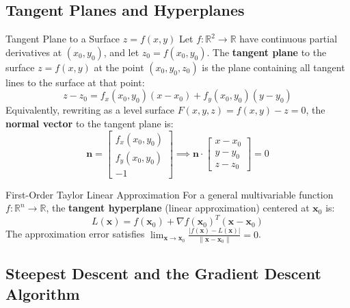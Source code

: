 \subsection{Tangent Planes and Hyperplanes}

\begin{definitionbox}{Tangent Plane to a Surface $z = f(x, y)$}
Let $f: \mathbb{R}^2 \to \mathbb{R}$ have continuous partial derivatives at $(x_0, y_0)$, and let $z_0 = f(x_0, y_0)$. The \textbf{tangent plane} to the surface $z = f(x, y)$ at the point $(x_0, y_0, z_0)$ is the plane containing all tangent lines to the surface at that point:
\begin{equation}
z - z_0 = f_x(x_0, y_0)(x - x_0) + f_y(x_0, y_0)(y - y_0)
\end{equation}
Equivalently, rewriting as a level surface $F(x, y, z) = f(x, y) - z = 0$, the \textbf{normal vector} to the tangent plane is:
\begin{equation}
\mathbf{n} = \begin{bmatrix} f_x(x_0, y_0) \\ f_y(x_0, y_0) \\ -1 \end{bmatrix} \implies \mathbf{n} \cdot \begin{bmatrix} x - x_0 \\ y - y_0 \\ z - z_0 \end{bmatrix} = 0
\end{equation}
\end{definitionbox}

\begin{definitionbox}{First-Order Taylor Linear Approximation}
For a general multivariable function $f: \mathbb{R}^n \to \mathbb{R}$, the \textbf{tangent hyperplane} (linear approximation) centered at $\mathbf{x}_0$ is:
\begin{equation}
L(\mathbf{x}) = f(\mathbf{x}_0) + \nabla f(\mathbf{x}_0)^T (\mathbf{x} - \mathbf{x}_0)
\end{equation}
The approximation error satisfies $\lim_{\mathbf{x} \to \mathbf{x}_0} \frac{|f(\mathbf{x}) - L(\mathbf{x})|}{\|\mathbf{x} - \mathbf{x}_0\|} = 0$.
\end{definitionbox}

\subsection{Steepest Descent and the Gradient Descent Algorithm}

